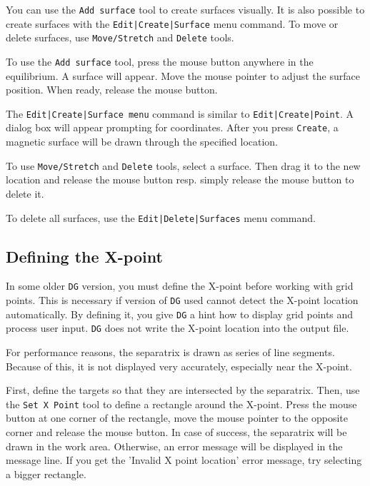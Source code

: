 \documentclass[a4paper,10pt]{report}
\begin{document}
You can use the {\tt Add surface} tool to create surfaces visually. It is
also possible to create surfaces with the {\tt Edit|Create|Surface} menu
command. To move or delete surfaces, use {\tt Move/Stretch} and {\tt Delete}
tools.

To use the {\tt Add surface} tool, press the mouse button anywhere in
the equilibrium. A surface will appear. Move the mouse pointer to
adjust the surface position. When ready, release the mouse button.

The {\tt Edit|Create|Surface menu} command is similar to
{\tt Edit|Create|Point}. A dialog box will appear prompting for
coordinates. After you press {\tt Create}, a magnetic surface will be drawn
through the specified location.

To use {\tt Move/Stretch} and {\tt Delete} tools, select a surface.
Then drag it to the new location and release the mouse button resp.
simply release the mouse button to delete it.

To delete all surfaces, use the {\tt Edit|Delete|Surfaces} menu command.

\subsection{Defining the X-point}

In some older {\tt DG} version, you must define the X-point before working with grid points. This is
necessary if version of {\tt DG} used cannot detect the X-point
location automatically. By defining it, you give {\tt DG} a hint how to
display grid points and process user input. {\tt DG} does not write the
X-point location into the output file.

For performance reasons, the separatrix is drawn as series of line
segments. Because of this, it is not displayed very accurately,
especially near the X-point.

First, define the targets so that they are intersected by the
separatrix. Then, use the {\tt Set X Point} tool to define a rectangle
around the X-point. Press the mouse button at one corner of the
rectangle, move the mouse pointer to the opposite corner and release
the mouse button. In case of success, the separatrix will be drawn in
the work area. Otherwise, an error message will be displayed in the
message line. If you get the 'Invalid X point location' error message,
try selecting a bigger rectangle.
\end{document}
